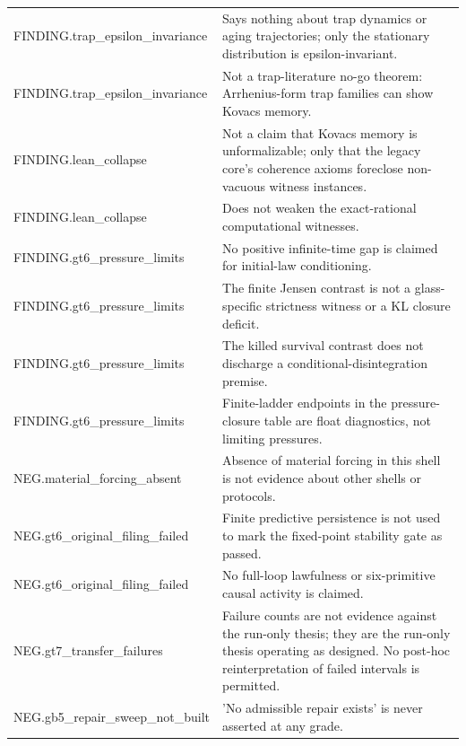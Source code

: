 \begin{longtable}{>{\raggedright\arraybackslash}p{3.6cm}p{11.6cm}}
FINDING.\allowbreak{}trap\_\allowbreak{}epsilon\_\allowbreak{}invariance & Says nothing about trap dynamics or aging trajectories; only the stationary distribution is epsilon-invariant. \\
FINDING.\allowbreak{}trap\_\allowbreak{}epsilon\_\allowbreak{}invariance & Not a trap-literature no-go theorem: Arrhenius-form trap families can show Kovacs memory. \\
FINDING.\allowbreak{}lean\_\allowbreak{}collapse & Not a claim that Kovacs memory is unformalizable; only that the legacy core's coherence axioms foreclose non-vacuous witness instances. \\
FINDING.\allowbreak{}lean\_\allowbreak{}collapse & Does not weaken the exact-rational computational witnesses. \\
FINDING.\allowbreak{}gt6\_\allowbreak{}pressure\_\allowbreak{}limits & No positive infinite-time gap is claimed for initial-law conditioning. \\
FINDING.\allowbreak{}gt6\_\allowbreak{}pressure\_\allowbreak{}limits & The finite Jensen contrast is not a glass-specific strictness witness or a KL closure deficit. \\
FINDING.\allowbreak{}gt6\_\allowbreak{}pressure\_\allowbreak{}limits & The killed survival contrast does not discharge a conditional-disintegration premise. \\
FINDING.\allowbreak{}gt6\_\allowbreak{}pressure\_\allowbreak{}limits & Finite-ladder endpoints in the pressure-closure table are float diagnostics, not limiting pressures. \\
NEG.\allowbreak{}material\_\allowbreak{}forcing\_\allowbreak{}absent & Absence of material forcing in this shell is not evidence about other shells or protocols. \\
NEG.\allowbreak{}gt6\_\allowbreak{}original\_\allowbreak{}filing\_\allowbreak{}failed & Finite predictive persistence is not used to mark the fixed-point stability gate as passed. \\
NEG.\allowbreak{}gt6\_\allowbreak{}original\_\allowbreak{}filing\_\allowbreak{}failed & No full-loop lawfulness or six-primitive causal activity is claimed. \\
NEG.\allowbreak{}gt7\_\allowbreak{}transfer\_\allowbreak{}failures & Failure counts are not evidence against the run-only thesis; they are the run-only thesis operating as designed. No post-hoc reinterpretation of failed intervals is permitted. \\
NEG.\allowbreak{}gb5\_\allowbreak{}repair\_\allowbreak{}sweep\_\allowbreak{}not\_\allowbreak{}built & 'No admissible repair exists' is never asserted at any grade. \\

\end{longtable}
